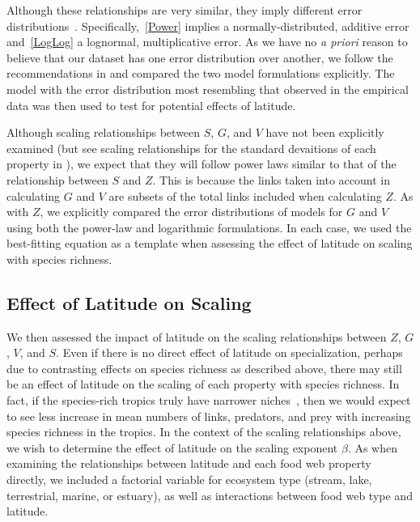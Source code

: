 \documentclass[12pt]{article}
\begin{document}
Although these relationships are very similar, they imply different error distributions~\citep{Xiao2011}.
Specifically,~\ref{Power} implies a normally-distributed, additive error and~\ref{LogLog} a lognormal,
multiplicative error. As we have no \emph{a priori} reason to believe that our dataset has one error distribution
over another, we follow the recommendations in \citet{Xiao2011} and compared the two
model formulations explicitly. The model with the error distribution most resembling that observed in the empirical
data was then used to test for potential effects of latitude.


Although scaling relationships between $S$, $G$, and $V$ have not been explicitly examined (but see scaling 
relationships for the standard devaitions of each property in \citet{Riede2010}), we expect that they will follow
power laws similar to that of the relationship between $S$ and $Z$. This is because the links taken into account in
calculating $G$ and $V$ are subsets of the total links included when calculating $Z$. As with $Z$, we explicitly 
compared the error distributions of models for $G$ and $V$ using both the power-law and logarithmic formulations. 
In each case, we used the best-fitting equation as a template when assessing the effect of latitude on scaling with
species richness.



\subsection*{Effect of Latitude on Scaling}



We then assessed the impact of latitude on the scaling relationships between $Z$, $G$, $V$, and $S$. 
Even if there is no direct effect of latitude on specialization, perhaps due to contrasting effects
on species richness as described above, there may still be an effect of latitude on the scaling of
each property with species richness. In fact, if the species-rich tropics truly have narrower 
niches~\citep{Brown2004}, then we would expect to see less increase in mean numbers of links, 
predators, and prey with increasing species richness in the tropics.
In the context of the scaling relationships above, we wish to determine the effect of latitude on
the scaling exponent $\beta$. As when examining the relationships between latitude and each food 
web property directly, we included a factorial variable for ecosystem type (stream, lake, 
terrestrial, marine, or estuary), as well as interactions between food web type and latitude.
\end{document}
